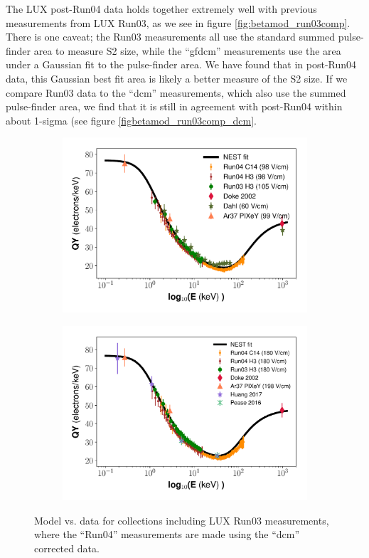 The LUX post-Run04 data holds together extremely well with previous measurements from LUX Run03, as we see in figure \ref{fig:betamod_run03comp}. There is one caveat; the Run03 measurements all use the standard summed pulse-finder area to measure S2 size, while the ``gfdcm'' measurements use the area under a Gaussian fit to the pulse-finder area. We have found that in post-Run04 data, this Gaussian best fit area is likely a better measure of the S2 size. If we compare Run03 data to the ``dcm'' measurements, which also use the summed pulse-finder area, we find that it is still in agreement with post-Run04 within about 1-sigma (see figure \ref{figbetamod_run03comp_dcm}.
\begin{figure}[!h]
\centering
\begin{subfigure}{0.5\linewidth}
\includegraphics[width=\linewidth]{Figures/Yields_fit_new/NEST_fit_98Vcm_new_dcm.pdf}
\caption{}
\end{subfigure}%
\begin{subfigure}{0.5\linewidth}
\includegraphics[width=\linewidth]{Figures/Yields_fit_new/NEST_fit_180Vcm_new_dcm.pdf}
\caption{}
\end{subfigure}
\caption{Model vs. data for collections including LUX Run03 measurements, where the ``Run04'' measurements are made using the ``dcm'' corrected data.}
\label{fig:betamod_run03comp_dcm}
\end{figure}

